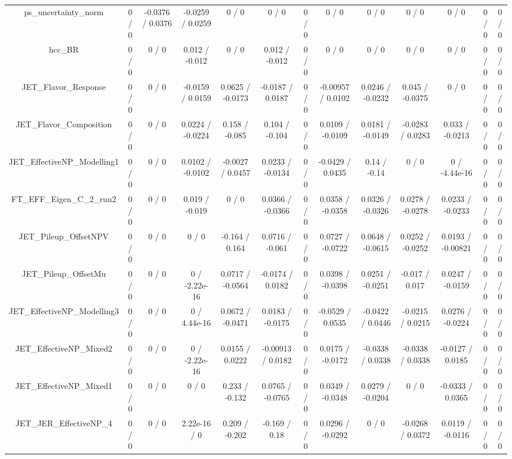 \documentclass[10pt]{article}
\begin{document}
\begin{table}[htbp]
\begin{center}
\begin{tabular}{|c|c|c|c|c|c|c|c|c|c|c|c|c|}
  ps_uncertainty_norm & 0 / 0 & -0.0376 / 0.0376 & -0.0259 / 0.0259 & 0 / 0 & 0 / 0 & 0 / 0 & 0 / 0 & 0 / 0 & 0 / 0 & 0 / 0 & 0 / 0 & 0 / 0 \\ 
  hcc_BR & 0 / 0 & 0 / 0 & 0.012 / -0.012 & 0 / 0 & 0.012 / -0.012 & 0 / 0 & 0 / 0 & 0 / 0 & 0 / 0 & 0 / 0 & 0 / 0 & 0 / 0 \\ 
  JET_Flavor_Response & 0 / 0 & 0 / 0 & -0.0159 / 0.0159 & 0.0625 / -0.0173 & -0.0187 / 0.0187 & 0 / 0 & -0.00957 / 0.0102 & 0.0246 / -0.0232 & 0.045 / -0.0375 & 0 / 0 & 0 / 0 & 0 / 0 \\ 
  JET_Flavor_Composition & 0 / 0 & 0 / 0 & 0.0224 / -0.0224 & 0.158 / -0.085 & 0.104 / -0.104 & 0 / 0 & 0.0109 / -0.0109 & 0.0181 / -0.0149 & -0.0283 / 0.0283 & 0.033 / -0.0213 & 0 / 0 & 0 / 0 \\ 
  JET_EffectiveNP_Modelling1 & 0 / 0 & 0 / 0 & 0.0102 / -0.0102 & -0.0027 / 0.0457 & 0.0233 / -0.0134 & 0 / 0 & -0.0429 / 0.0435 & 0.14 / -0.14 & 0 / 0 & 0 / -4.44e-16 & 0 / 0 & 0 / 0 \\ 
  FT_EFF_Eigen_C_2_run2 & 0 / 0 & 0 / 0 & 0.019 / -0.019 & 0 / 0 & 0.0366 / -0.0366 & 0 / 0 & 0.0358 / -0.0358 & 0.0326 / -0.0326 & 0.0278 / -0.0278 & 0.0233 / -0.0233 & 0 / 0 & 0 / 0 \\ 
  JET_Pileup_OffsetNPV & 0 / 0 & 0 / 0 & 0 / 0 & -0.164 / 0.164 & 0.0716 / -0.061 & 0 / 0 & 0.0727 / -0.0722 & 0.0648 / -0.0615 & 0.0252 / -0.0252 & 0.0193 / -0.00821 & 0 / 0 & 0 / 0 \\ 
  JET_Pileup_OffsetMu & 0 / 0 & 0 / 0 & 0 / -2.22e-16 & 0.0717 / -0.0564 & -0.0174 / 0.0182 & 0 / 0 & 0.0398 / -0.0398 & 0.0251 / -0.0251 & -0.017 / 0.017 & 0.0247 / -0.0159 & 0 / 0 & 0 / 0 \\ 
  JET_EffectiveNP_Modelling3 & 0 / 0 & 0 / 0 & 0 / 4.44e-16 & 0.0672 / -0.0471 & 0.0183 / -0.0175 & 0 / 0 & -0.0529 / 0.0535 & -0.0422 / 0.0446 & -0.0215 / 0.0215 & 0.0276 / -0.0224 & 0 / 0 & 0 / 0 \\ 
  JET_EffectiveNP_Mixed2 & 0 / 0 & 0 / 0 & 0 / -2.22e-16 & 0.0155 / 0.0222 & -0.00913 / 0.0182 & 0 / 0 & 0.0175 / -0.0172 & -0.0338 / 0.0338 & -0.0338 / 0.0338 & -0.0127 / 0.0185 & 0 / 0 & 0 / 0 \\ 
  JET_EffectiveNP_Mixed1 & 0 / 0 & 0 / 0 & 0 / 0 & 0.233 / -0.132 & 0.0765 / -0.0765 & 0 / 0 & 0.0349 / -0.0348 & 0.0279 / -0.0204 & 0 / 0 & -0.0333 / 0.0365 & 0 / 0 & 0 / 0 \\ 
  JET_JER_EffectiveNP_4 & 0 / 0 & 0 / 0 & 2.22e-16 / 0 & 0.209 / -0.202 & -0.169 / 0.18 & 0 / 0 & 0.0296 / -0.0292 & 0 / 0 & -0.0268 / 0.0372 & 0.0119 / -0.0116 & 0 / 0 & 0 / 0 \\ 

\end{tabular}
\end{center}
\end{table}
\end{document}

